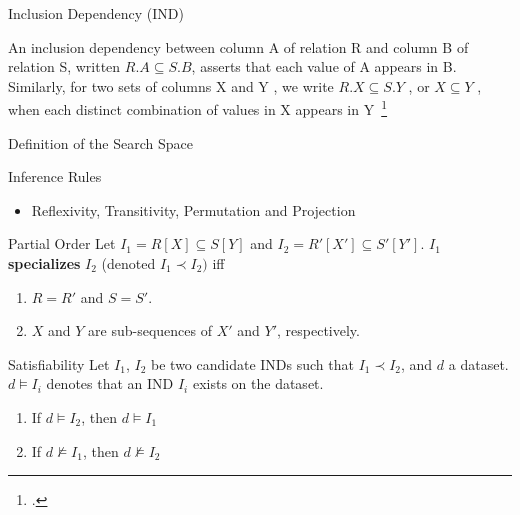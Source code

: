 \documentclass[10pt,compress]{beamer}
\begin{document}
\begin{frame}{Inclusion Dependency (IND)}
    \begin{block}{}
        \smallskip
        An inclusion dependency between column A of relation
        R and column B of relation S, written $R.A \subseteq S.B$, asserts that each
        value of A appears in B. Similarly, for two sets of columns X
        and Y , we write $R.X \subseteq S.Y$ , or $X \subseteq Y$ , when each distinct
        combination of values in X appears in Y~\footcite{Casanova1984,DeMarchi2002,abedjan2015}
    \end{block}
\end{frame}

\begin{frame}{Definition of the Search Space}
        \begin{block}{Inference Rules}
        \begin{itemize}
            \item Reflexivity, Transitivity, Permutation and Projection
        \end{itemize}
    \end{block}
    \begin{block}{Partial Order}
        Let $I_1 = R[X] \subseteq S[Y]$ and $I_2 = R'[X'] \subseteq S'[Y']$.       
        $I_1$ \textbf{specializes} $I_2$ (denoted $I_1 \prec I_2)$ iff
        \begin{enumerate}
            \item $R = R'$ and $S = S'$.
            \item $X$ and $Y$ are sub-sequences of $X'$ and $Y'$, respectively.
        \end{enumerate}
    \end{block}
    \begin{block}{Satisfiability}
         Let $I_1$, $I_2$ be two candidate INDs such that $I_1 \prec I_2$, and $d$ a dataset.
         $d \models I_i$ denotes that an IND $I_i$ exists on the dataset.
         \begin{enumerate}
             \item If $d \models I_2$, then $d \models I_1$
             \item If $d \not\models I_1$, then $d \not\models I_2$
         \end{enumerate}
    \end{block}
\end{frame}
\end{document}
